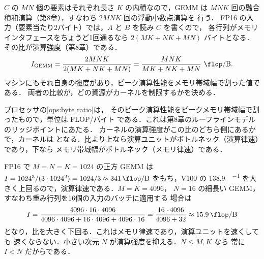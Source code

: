 \documentclass[../main.tex]{subfiles}
\begin{document}
$C$ の $MN$ 個の要素はそれぞれ長さ $K$ の内積なので，GEMM は
$MNK$ 回の融合積和演算（第8章），すなわち $2MNK$ 回の浮動小数点演算を
行う．
FP16 の入力（要素当たり2バイト）では，$A$ と $B$ を読み $C$ を書くので，
各行列がメモリインタフェースをちょうど1回通るなら $2(MK + NK + MN)$
バイトとなる．その比が演算強度（第8章）である．
\begin{equation}
  I_{\text{GEMM}}
  = \frac{2MNK}{2(MK + NK + MN)}
  = \frac{MNK}{MK + NK + MN}\ \si{\flop\per\byte} .
  \label{eq:l12-ai}
\end{equation}
%
マシンにもそれ自身の強度があり，ピーク演算性能をメモリ帯域幅で割った値である．
両者の比較が，どの資源がカーネルを制限するかを決める．

\begin{definition}
  プロセッサの[ops:byte ratio]は，
  そのピーク演算性能をピークメモリ帯域幅で割ったもので，単位は FLOP/バイト
  である．これは第8章のルーフラインモデルのリッジポイントにあたる．
  カーネルの演算強度がこの比のどちら側にあるかで，カーネルは
  となる．比より上なら演算ユニットがボトルネック（演算律速）であり，下なら
  メモリ帯域幅がボトルネック（メモリ律速）である．
\end{definition}

\begin{example}
  \label{ex:l12-ai}
  FP16 で $M = N = K = 1024$ の正方 GEMM は
  $I = 1024^3 / (3 \cdot 1024^2) = 1024/3 \approx
  \SI{341}{\flop\per\byte}$ をもち，V100 の
  \SI{138.9}{\flop\per\byte} を大きく上回るので，演算律速である．$M = K = 4096$，
  $N = 16$ の細長い GEMM，すなわち重み行列を16個の入力のバッチに適用する
  場合は
  \[
    I = \frac{4096 \cdot 16 \cdot 4096}
             {4096 \cdot 4096 + 16 \cdot 4096 + 4096 \cdot 16}
      = \frac{16 \cdot 4096}{4096 + 32}
      \approx \SI{15.9}{\flop\per\byte}
  \]
  となり，比を大きく下回る．これはメモリ律速であり，演算ユニットを速くしても
  速くならない．小さい次元 $N$ が演算強度を抑える．$N \le M, K$ なら
  常に $I < N$ だからである．
\end{example}
\end{document}

